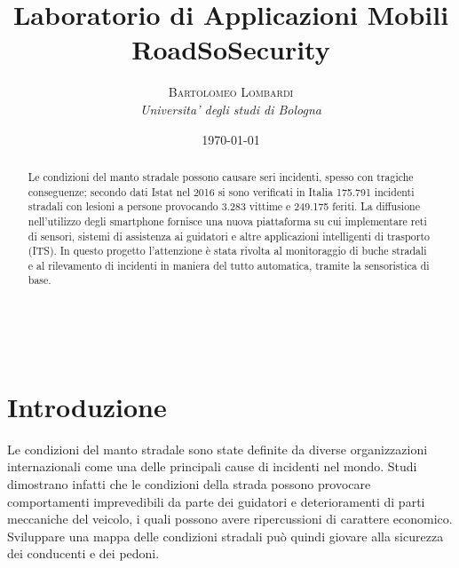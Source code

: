 \documentclass[a4paper, 11pt]{article} %
\title{\textbf{Laboratorio di Applicazioni Mobili}\\ %
RoadSoSecurity} %
\author{\textsc{Bartolomeo Lombardi} %
\\{\textit{Universita' degli studi di Bologna}}} %
\date{\today} %
\makeatletter
\renewcommand{\maketitle}{ %
\begin{flushright} %
{\LARGE\@title} %

\vspace{50pt} %

{\large\@author} %
\\\@date %

\vspace{40pt} %
\end{flushright}
}
\makeatother
\begin{document}
\maketitle %



\begin{abstract}
Le condizioni del manto stradale possono causare seri incidenti, spesso con tragiche conseguenze; secondo dati Istat nel 2016 si sono verificati in Italia 175.791 incidenti stradali con lesioni a persone provocando 3.283 vittime e 249.175 feriti. La diffusione nell’utilizzo degli smartphone fornisce una nuova piattaforma su cui implementare reti di sensori, sistemi di assistenza ai guidatori e altre applicazioni intelligenti di trasporto (ITS). In questo progetto l'attenzione è stata rivolta al monitoraggio di buche stradali e al rilevamento di incidenti in maniera del tutto automatica, tramite la sensoristica di base.
\end{abstract}

\vspace{30pt} %


\section{Introduzione}
Le condizioni del manto stradale sono state definite da diverse organizzazioni internazionali come una delle principali cause di incidenti nel mondo. Studi dimostrano infatti che le condizioni della strada possono provocare comportamenti imprevedibili da parte dei guidatori e deterioramenti di parti meccaniche del veicolo, i quali possono avere ripercussioni di carattere economico. Sviluppare una mappa delle condizioni stradali può quindi giovare alla sicurezza dei conducenti e dei pedoni. 
\end{document}
